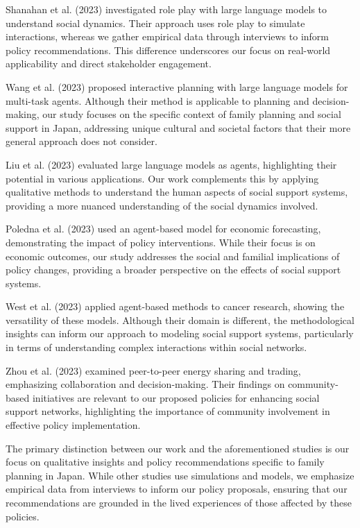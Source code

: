 \documentclass{article} %
\begin{document}
Shanahan et al. (2023) investigated role play with large language models to understand social dynamics. Their approach uses role play to simulate interactions, whereas we gather empirical data through interviews to inform policy recommendations. This difference underscores our focus on real-world applicability and direct stakeholder engagement.

Wang et al. (2023) proposed interactive planning with large language models for multi-task agents. Although their method is applicable to planning and decision-making, our study focuses on the specific context of family planning and social support in Japan, addressing unique cultural and societal factors that their more general approach does not consider.

Liu et al. (2023) evaluated large language models as agents, highlighting their potential in various applications. Our work complements this by applying qualitative methods to understand the human aspects of social support systems, providing a more nuanced understanding of the social dynamics involved.

Poledna et al. (2023) used an agent-based model for economic forecasting, demonstrating the impact of policy interventions. While their focus is on economic outcomes, our study addresses the social and familial implications of policy changes, providing a broader perspective on the effects of social support systems.

West et al. (2023) applied agent-based methods to cancer research, showing the versatility of these models. Although their domain is different, the methodological insights can inform our approach to modeling social support systems, particularly in terms of understanding complex interactions within social networks.

Zhou et al. (2023) examined peer-to-peer energy sharing and trading, emphasizing collaboration and decision-making. Their findings on community-based initiatives are relevant to our proposed policies for enhancing social support networks, highlighting the importance of community involvement in effective policy implementation.

The primary distinction between our work and the aforementioned studies is our focus on qualitative insights and policy recommendations specific to family planning in Japan. While other studies use simulations and models, we emphasize empirical data from interviews to inform our policy proposals, ensuring that our recommendations are grounded in the lived experiences of those affected by these policies.
\end{document}
